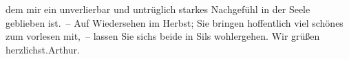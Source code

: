 \begin{ledgroupsized}[t]{13cm}
               dem mir ein unverlierbar und untrüglich starkes \introOben{}\strikeout{\textcolor{gray}{×}\-\textcolor{gray}{×}\-\textcolor{gray}{×}\-\textcolor{gray}{×}\-\textcolor{gray}{×}\-\textcolor{gray}{×}\-\textcolor{gray}{×}\-\textcolor{gray}{×}\-\textcolor{gray}{×}\-\textcolor{gray}{×}}\introOben{} Nachgefühl in der Seele geblieben ist. –\pend
           \pstart
           Auf Wiedersehen im Herbst; Sie bringen hoffentlich viel schönes zum
               vorlesen mit, – lassen Sie sichs beide in Sils
               wohlergehen.\pend
           \pstart Wir grüßen herzlichst.\spacefill\mbox{Arthur.}\pend{}
         
         \endnumbering{}\end{ledgroupsized}  \newcommand{\dateiname}{L01786}\newcommand{\titel}{Arthur Schnitzler an Hugo von Hofmannsthal, 6. 8. 1908}\newcommand{\editorInnen}{Martin Anton Müller und Gerd-Hermann Susen}
      